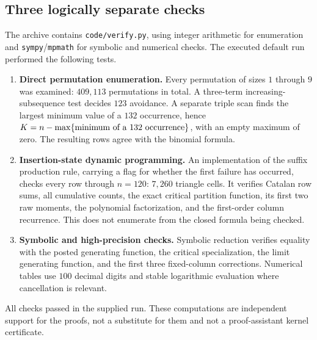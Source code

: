 \documentclass[11pt]{article}
\numberwithin{equation}{section}
\theoremstyle{definition}
\begin{document}
\subsection{Three logically separate checks}
The archive contains \texttt{code/verify.py}, using integer arithmetic for
enumeration and \texttt{sympy}/\texttt{mpmath} for symbolic and numerical
checks. The executed default run performed the following tests.
\begin{enumerate}[leftmargin=2em]
\item \textbf{Direct permutation enumeration.} Every permutation of sizes
$1$ through $9$ was examined: $409{,}113$ permutations in total. A
three-term increasing-subsequence test decides $123$ avoidance. A separate
triple scan finds the largest minimum value of a $132$ occurrence, hence
$K=n-\max\{\hbox{minimum of a $132$ occurrence}\}$, with an empty maximum
of zero. The resulting rows agree with the binomial formula.
\item \textbf{Insertion-state dynamic programming.} An implementation of
the suffix production rule, carrying a flag for whether the first failure
has occurred, checks every row through $n=120$: $7{,}260$ triangle cells.
It verifies Catalan row sums, all cumulative counts, the exact critical
partition function, its first two raw moments, the polynomial factorization,
and the first-order column recurrence. This does not enumerate from the
closed formula being checked.
\item \textbf{Symbolic and high-precision checks.} Symbolic reduction
verifies equality with the posted generating function, the critical
specialization, the limit generating function, and the first three
fixed-column corrections. Numerical tables use $100$ decimal digits and
stable logarithmic evaluation where cancellation is relevant.
\end{enumerate}
All checks passed in the supplied run. These computations are independent
support for the proofs, not a substitute for them and not a proof-assistant
kernel certificate.
\end{document}
